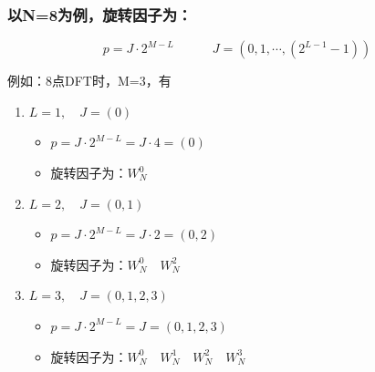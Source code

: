 \documentclass[notheorems,compress,mathserif,table]{beamer}
\begin{document}
%
%
%
\begin{frame}[shrink]\frametitle{以N=8为例，旋转因子为：}%
$$p=J\cdot 2^{M-L} \quad\quad\quad J=(0,1,\cdots,(2^{L-1}-1))$$
\par 例如：8点DFT时，M=3，有
\begin{enumerate}
  \item $L=1,\quad J=(0)  $%
        \begin{itemize}
          \item $p=J\cdot 2^{M-L}=J\cdot 4=(0)$
          \item $\mbox{旋转因子为：}  W_{N}^{0}$
        \end{itemize}
  \item $L=2,\quad J=(0,1) $%
        \begin{itemize}
          \item $p=J\cdot 2^{M-L}=J\cdot2=(0,2)$
          \item $\mbox{旋转因子为：}  W_{N}^{0}\quad W_{N}^{2}$
        \end{itemize}
  \item $L=3,\quad J=(0,1,2,3)$%
        \begin{itemize}
          \item $p=J\cdot 2^{M-L}=J=(0,1,2,3)$
          \item $\mbox{旋转因子为：}  W_{N}^{0}\quad W_{N}^{1}\quad W_{N}^{2}\quad W_{N}^{3}$
        \end{itemize}
\end{enumerate}

\end{frame}
%
%
%
\end{document}
